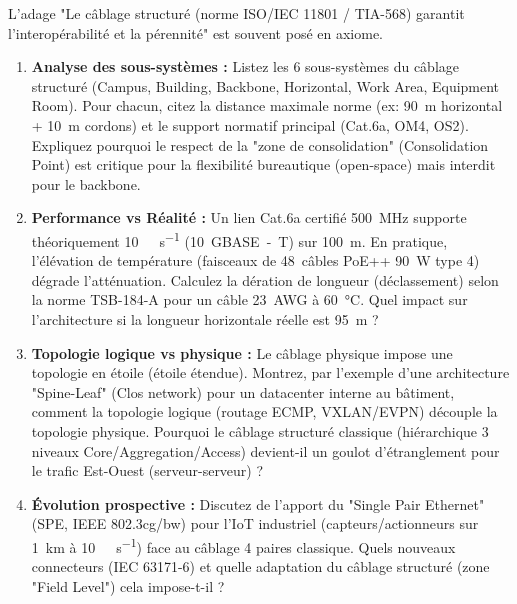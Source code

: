 \documentclass[11pt]{article}
\begin{document}
\begin{exercice}
L'adage "Le câblage structuré (norme ISO/IEC 11801 / TIA-568) garantit l'interopérabilité et la pérennité" est souvent posé en axiome.
\begin{enumerate}
    \item \textbf{Analyse des sous-systèmes :} Listez les 6 sous-systèmes du câblage structuré (Campus, Building, Backbone, Horizontal, Work Area, Equipment Room). Pour chacun, citez la distance maximale norme (ex: \SI{90}{m} horizontal + \SI{10}{m} cordons) et le support normatif principal (Cat.6a, OM4, OS2). Expliquez pourquoi le respect de la "zone de consolidation" (Consolidation Point) est critique pour la flexibilité bureautique (open-space) mais interdit pour le backbone.
    \item \textbf{Performance vs Réalité :} Un lien Cat.6a certifié \SI{500}{\mega\hertz} supporte théoriquement \SI{10}{\giga\bit\per\second} (\SI{10}{GBASE-T}) sur \SI{100}{m}. En pratique, l'élévation de température (faisceaux de \SI{48}{câbles} PoE++ \SI{90}{W} type 4) dégrade l'atténuation. Calculez la dération de longueur (déclassement) selon la norme TSB-184-A pour un câble \SI{23}{AWG} à \SI{60}{\celsius}. Quel impact sur l'architecture si la longueur horizontale réelle est \SI{95}{m} ?
    \item \textbf{Topologie logique vs physique :} Le câblage physique impose une topologie en étoile (étoile étendue). Montrez, par l'exemple d'une architecture "Spine-Leaf" (Clos network) pour un datacenter interne au bâtiment, comment la topologie logique (routage ECMP, VXLAN/EVPN) découple la topologie physique. Pourquoi le câblage structuré classique (hiérarchique 3 niveaux Core/Aggregation/Access) devient-il un goulot d'étranglement pour le trafic Est-Ouest (serveur-serveur) ?
    \item \textbf{Évolution prospective :} Discutez de l'apport du "Single Pair Ethernet" (SPE, IEEE 802.3cg/bw) pour l'IoT industriel (capteurs/actionneurs sur \SI{1}{km} à \SI{10}{\mega\bit\per\second}) face au câblage 4 paires classique. Quels nouveaux connecteurs (IEC 63171-6) et quelle adaptation du câblage structuré (zone "Field Level") cela impose-t-il ?
\end{enumerate}
\end{exercice}
\end{document}
